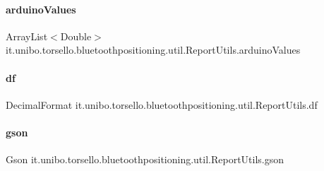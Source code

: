 \paragraph{\texorpdfstring{arduino\+Values}{arduinoValues}}
{\footnotesize\ttfamily Array\+List$<$Double$>$ it.\+unibo.\+torsello.\+bluetoothpositioning.\+util.\+Report\+Utils.\+arduino\+Values\hspace{0.3cm}{\ttfamily [private]}}

\hypertarget{classit_1_1unibo_1_1torsello_1_1bluetoothpositioning_1_1util_1_1ReportUtils_a2801b38f420793bdb4024b08fb25c155_a2801b38f420793bdb4024b08fb25c155}{}\label{classit_1_1unibo_1_1torsello_1_1bluetoothpositioning_1_1util_1_1ReportUtils_a2801b38f420793bdb4024b08fb25c155_a2801b38f420793bdb4024b08fb25c155} 
\paragraph{\texorpdfstring{df}{df}}
{\footnotesize\ttfamily Decimal\+Format it.\+unibo.\+torsello.\+bluetoothpositioning.\+util.\+Report\+Utils.\+df\hspace{0.3cm}{\ttfamily [private]}}

\hypertarget{classit_1_1unibo_1_1torsello_1_1bluetoothpositioning_1_1util_1_1ReportUtils_a974d9bac8edb83847a34b20db0299fca_a974d9bac8edb83847a34b20db0299fca}{}\label{classit_1_1unibo_1_1torsello_1_1bluetoothpositioning_1_1util_1_1ReportUtils_a974d9bac8edb83847a34b20db0299fca_a974d9bac8edb83847a34b20db0299fca} 
\paragraph{\texorpdfstring{gson}{gson}}
{\footnotesize\ttfamily Gson it.\+unibo.\+torsello.\+bluetoothpositioning.\+util.\+Report\+Utils.\+gson\hspace{0.3cm}{\ttfamily [private]}}

